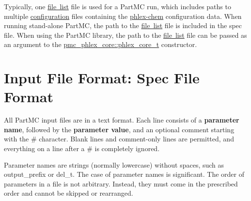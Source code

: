 Typically, one \mbox{\hyperlink{input_format_phlex_file_list}{file list}} file is used for a Part\+MC run, which includes paths to multiple \mbox{\hyperlink{input_format_phlex_config}{configuration}} files containing the \mbox{\hyperlink{phlex_chem}{phlex-\/chem}} configuration data. When running stand-\/alone Part\+MC, the path to the \mbox{\hyperlink{input_format_phlex_file_list}{file list}} file is included in the spec file. When using the Part\+MC library, the path to the \mbox{\hyperlink{input_format_phlex_file_list}{file list}} file can be passed as an argument to the {\ttfamily \mbox{\hyperlink{structpmc__phlex__core_1_1phlex__core__t}{pmc\+\_\+phlex\+\_\+core\+::phlex\+\_\+core\+\_\+t}}} constructor. \hypertarget{spec_file_format}{}\section{Input File Format\+: Spec File Format}\label{spec_file_format}
All Part\+MC input files are in a text format. Each line consists of a {\bfseries parameter name}, followed by the {\bfseries parameter value}, and an optional comment starting with the \# character. Blank lines and comment-\/only lines are permitted, and everything on a line after a \# is completely ignored.

Parameter names are strings (normally lowercase) without spaces, such as {\ttfamily output\+\_\+prefix} or {\ttfamily del\+\_\+t}. The case of parameter names is significant. The order of parameters in a file is not arbitrary. Instead, they must come in the prescribed order and cannot be skipped or rearranged.

